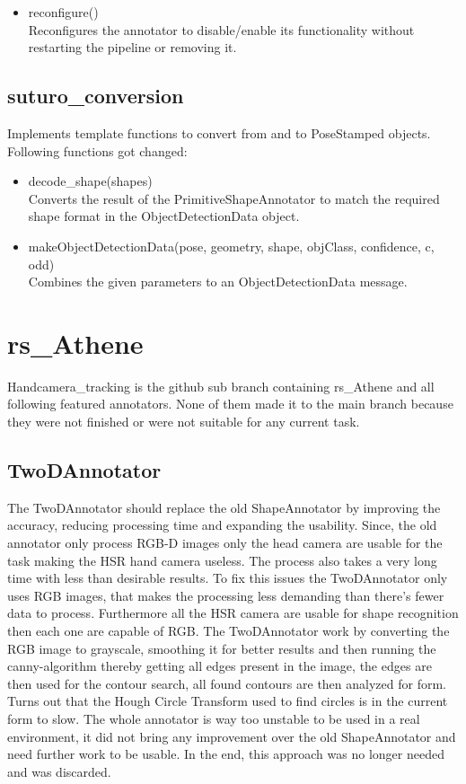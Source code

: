 \documentclass[main.tex]{subfiles}
\begin{document}
\begin{itemize}
\item reconfigure()\\
Reconfigures the annotator to disable/enable its functionality without restarting the pipeline or removing it.
\end{itemize}

\subsection{suturo\_conversion}
Implements template functions to convert from and to PoseStamped objects.
Following functions got changed:

\begin{itemize}
\item decode\_shape(shapes)\\
Converts the result of the PrimitiveShapeAnnotator to match the required shape format in the ObjectDetectionData object.

\item makeObjectDetectionData(pose, geometry, shape, objClass, confidence, c, odd)\\
Combines the given parameters to an ObjectDetectionData message.
\end{itemize}

			\section{rs\_Athene}
Handcamera\_tracking is the github sub branch containing rs\_Athene and all following featured annotators. 
None of them made it to the main branch because they were not finished or were not suitable for any current task.

				\subsection{TwoDAnnotator}
The TwoDAnnotator should replace the old ShapeAnnotator by improving the accuracy, reducing processing time and expanding the usability. 
Since, the old annotator only process RGB-D images only the head camera are usable for the task making the HSR hand camera useless. The process also takes a very long time with less than desirable results.
To fix this issues the TwoDAnnotator only uses RGB images, that makes the processing less demanding than there's fewer data to process. Furthermore all the HSR camera are usable for shape recognition then each one are capable of RGB.
The TwoDAnnotator work by converting the RGB image to grayscale, smoothing it for better results and then running the canny-algorithm thereby getting all edges present in the image, the edges are then used for the contour search, all found contours are then analyzed for form.
Turns out that the Hough Circle Transform used to find circles is in the current form to slow. The whole annotator is way too unstable to be used in a real environment, it did not bring any improvement over the old ShapeAnnotator and need further work to be usable. 
In the end, this approach was no longer needed and was discarded. 
\end{document}
